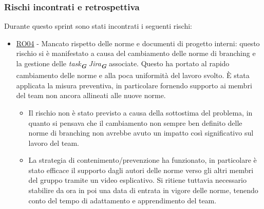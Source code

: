 \documentclass[a4paper,12pt]{article}
\newcommand{\glossario}[1]{\textit{#1}\textsubscript{\textbf{\textit{\textcolor{lightblack}{G}}}}}
\begin{document}
\subsubsection{Rischi incontrati e retrospettiva}
Durante questo sprint sono stati incontrati i seguenti rischi:
\begin{itemize}
    \item \hyperref[RO04]{RO04} - Mancato rispetto delle norme e documenti di progetto interni: questo rischio si è manifestato a causa del cambiamento delle norme di branching e la gestione delle \glossario{task} \glossario{Jira} associate. Questo ha portato al rapido cambiamento delle norme e alla poca uniformità del lavoro svolto. È stata applicata la misura preventiva, in particolare fornendo supporto ai membri del team non ancora allineati alle nuove norme.
    \begin{itemize}
        \item Il rischio non è stato previsto a causa della sottostima del problema, in quanto si pensava che il cambiamento non sempre ben definito delle norme di branching non avrebbe avuto un impatto così significativo sul lavoro del team.
        \item La strategia di contenimento/prevenzione ha funzionato, in particolare è stato efficace il supporto dagli autori delle norme verso gli altri membri del gruppo tramite un video esplicativo. Si ritiene tuttavia necessario stabilire da ora in poi una data di entrata in vigore delle norme, tenendo conto del tempo di adattamento e apprendimento del team.
    \end{itemize}
\end{itemize}
\end{document}
